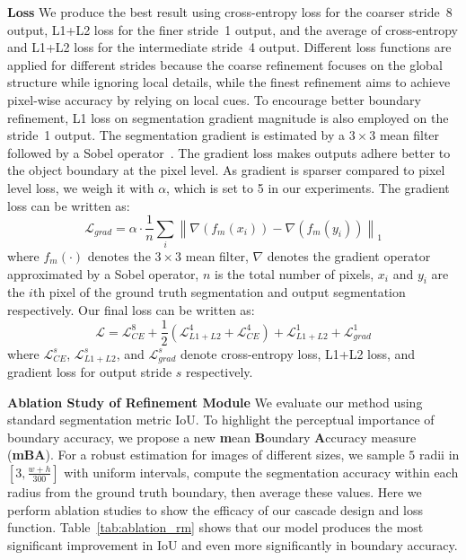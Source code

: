 \documentclass[10pt,twocolumn,letterpaper]{article}
\begin{document}
\noindent \textbf{Loss} \space \space
We produce the best result using cross-entropy loss for the coarser stride~8 output, L1+L2 loss for the finer stride~1 output, and the average of cross-entropy and L1+L2 loss for the intermediate stride~4 output. 
Different loss functions are applied for different strides because the coarse refinement focuses on the global structure while ignoring local details, while the finest refinement aims to achieve pixel-wise accuracy by relying on local cues.
To encourage better boundary refinement, L1 loss on segmentation gradient magnitude is also employed on the stride~1 output. The segmentation gradient is estimated by a $3\times3$ mean filter followed by a Sobel operator~\cite{kanopoulos1988design}. The gradient loss makes outputs adhere better to the object boundary at the pixel level. As gradient is sparser compared to pixel level loss, we weigh it with $\alpha$, which is set to 5 in our experiments. The gradient loss can be written as:
\begin{equation*}
\mathcal{L}_{\mathit{grad}} = \alpha \cdot \frac{1}{n} \sum_i{\left\lVert\nabla(f_m(x_i))-\nabla(f_m(y_i))\right\rVert_1}
\end{equation*}
where $f_m(\cdot)$ denotes the $3\times3$ mean filter, $\nabla$ denotes the gradient operator approximated by a Sobel operator, $n$ is the total number of pixels, $x_i$ and $y_i$ are the $i$th pixel of the ground truth segmentation and output segmentation respectively. Our final loss can be written as:
\begin{equation*}
\mathcal{L} = \mathcal{L}^8_{CE} + \frac{1}{2} (\mathcal{L}^4_{L1+L2} + \mathcal{L}^4_{CE}) + \mathcal{L}^1_{L1+L2} + \mathcal{L}^1_{\mathit{grad}}
\end{equation*}
where $\mathcal{L}^s_{CE}$, $\mathcal{L}^s_{L1+L2}$, and $\mathcal{L}^s_{\mathit{ grad}}$ denote cross-entropy loss, L1+L2 loss, and gradient loss for output stride $s$ respectively. 

\noindent \textbf{Ablation Study of Refinement Module} \space \space
We evaluate our method using standard segmentation metric IoU. To highlight the perceptual importance of boundary accuracy, we propose a new \textbf{m}ean \textbf{B}oundary \textbf{A}ccuracy measure (\textbf{mBA}). 
For a robust estimation for images of different sizes, we sample $5$ radii in $[3, \frac{w+h}{300}]$ with uniform intervals, compute the segmentation accuracy within each radius from the ground truth boundary, then average these values.
Here we perform ablation studies to show the efficacy of our cascade design and loss function. Table~\ref{tab:ablation_rm} shows that our model produces the most significant improvement in IoU and even more significantly in boundary accuracy.
\end{document}

